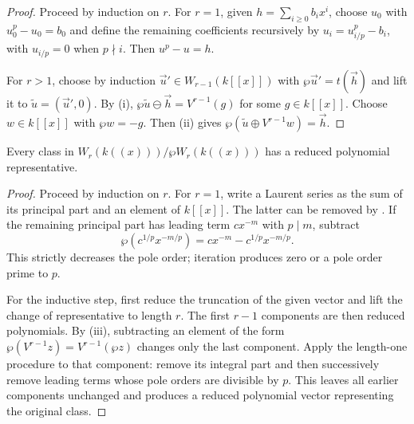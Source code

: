 \begin{proof}
Proceed by induction on $r$. For $r=1$, given
$h=\sum_{i\geq0}b_ix^i$, choose $u_0$ with
$u_0^p-u_0=b_0$ and define the remaining coefficients recursively by
$u_i=u_{i/p}^p-b_i$, with $u_{i/p}=0$ when $p\nmid i$. Then
$u^p-u=h$.

For $r>1$, choose by induction $\vec u'\in W_{r-1}(k[[x]])$ with
$\wp\vec u'=t(\vec h)$ and lift it to
$\widetilde u=(\vec u',0)$. By (i),
$\wp\widetilde u\ominus\vec h=V^{r-1}(g)$ for some $g\in k[[x]]$.
Choose $w\in k[[x]]$ with $\wp w=-g$. Then
(ii) gives
$\wp(\widetilde u\oplus V^{r-1}w)=\vec h$.
\end{proof}

\begin{prop}
\label{prop:reduced_polynomial_representatives}
Every class in $W_r(k((x)))/\wp W_r(k((x)))$ has a reduced polynomial
representative.
\end{prop}

\begin{proof}
Proceed by induction on $r$. For $r=1$, write a Laurent series as the sum of
its principal part and an element of $k[[x]]$. The latter can be removed by
. If the remaining principal part
has leading term $cx^{-m}$ with $p\mid m$, subtract
\[
\wp(c^{1/p}x^{-m/p})=cx^{-m}-c^{1/p}x^{-m/p}.
\]
This strictly decreases the pole order; iteration produces zero or a pole
order prime to $p$.

For the inductive step, first reduce the truncation of the given vector and
lift the change of representative to length $r$. The first $r-1$ components
are then reduced polynomials. By
(iii), subtracting an element of the form
$\wp(V^{r-1}z)=V^{r-1}(\wp z)$ changes only the last component. Apply the
length-one procedure to that component: remove its integral part and then
successively remove leading terms whose pole orders are divisible by $p$.
This leaves all earlier components unchanged and produces a reduced polynomial
vector representing the original class.
\end{proof}
